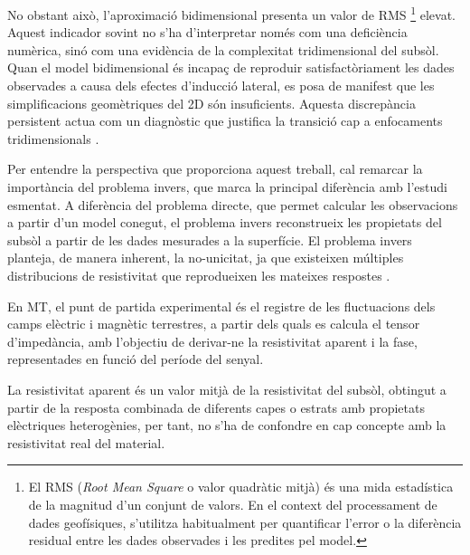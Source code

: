 \documentclass[11pt,a4paper,oneside]{article}
\begin{document}
\vspace{5pt}

No obstant això, l’aproximació bidimensional presenta un valor de RMS \footnote{El RMS (\textit{Root Mean Square} o valor quadràtic mitjà) és una mida estadística de la magnitud d'un conjunt de valors. En el context del processament de dades geofísiques, s'utilitza habitualment per quantificar l'error o la diferència residual entre les dades observades i les predites pel model.} elevat. Aquest indicador sovint no s'ha d'interpretar només com una deficiència numèrica, sinó com una evidència de la complexitat tridimensional del subsòl. Quan el model bidimensional és incapaç de reproduir satisfactòriament les dades observades a causa dels efectes d'inducció lateral, es posa de manifest que les simplificacions geomètriques del 2D són insuficients. Aquesta discrepància persistent actua com un diagnòstic que justifica la transició cap a enfocaments tridimensionals \citep{arango2005,egbert2014}. 
\vspace{5pt}

Per entendre la perspectiva que proporciona aquest treball, cal remarcar la importància del problema invers, que marca la principal diferència amb l’estudi esmentat. A diferència del problema directe, que permet calcular les observacions a partir d'un model conegut, el problema invers reconstrueix les propietats del subsòl a partir de les dades mesurades a la superfície. El problema invers planteja, de manera inherent, la no-unicitat, ja que existeixen múltiples distribucions de resistivitat que reprodueixen les mateixes respostes \citep{chavejones2012,egbert2014}. 

\vspace{5pt}

En MT, el punt de partida experimental és el registre de les fluctuacions dels camps elèctric i magnètic terrestres, a partir dels quals es calcula el tensor d'impedància, amb l'objectiu de derivar-ne la resistivitat aparent i la fase, representades en funció del període del senyal. 

\vspace{5pt}


La resistivitat aparent és un valor mitjà de la resistivitat del subsòl, obtingut a partir de la resposta combinada de diferents capes o estrats amb propietats elèctriques heterogènies, per tant, no s'ha de confondre en cap concepte amb la resistivitat real del material.

\vspace{5pt}
\end{document}
